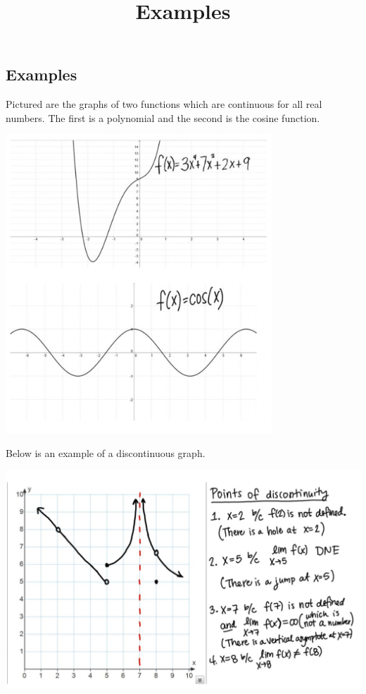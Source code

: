 \documentclass{ximera}
\title{Examples}
\begin{document}
\begin{abstract}
\end{abstract}

\maketitle


\subsection{Examples}

Pictured are the graphs of two functions which are continuous for all real numbers. The first is a polynomial and the second is the cosine function.

\begin{center}
    \includegraphics[width=0.75\textwidth]{graph5.png}
\end{center}

Below is an example of a discontinuous graph.

\begin{center}
    \includegraphics[width=\textwidth]{graph6.png}
\end{center}
\end{document}
